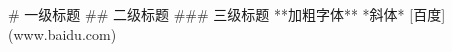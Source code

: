 \documentclass[UTF8]{ctexart}
\begin{document}
\begin{markdown}
# 一级标题
## 二级标题
### 三级标题
 **加粗字体**
 *斜体*
 [百度](www.baidu.com)
\end{markdown}
\end{document}
